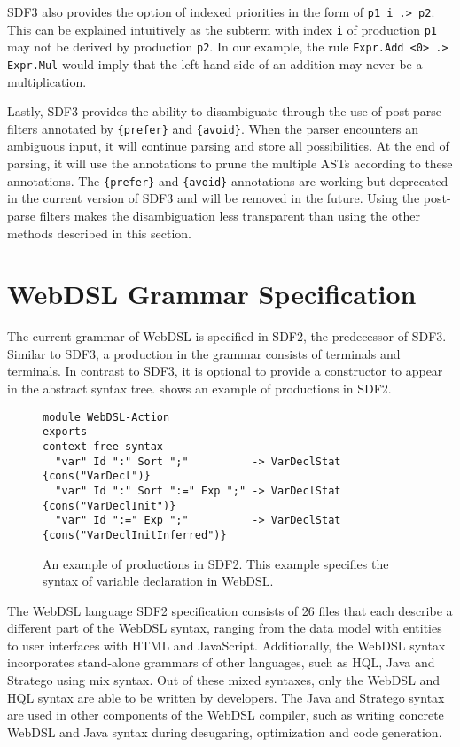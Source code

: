         SDF3 also provides the option of indexed priorities in the form of \texttt{p1 i .> p2}. This can be explained intuitively as the subterm with index \texttt{i} of production \texttt{p1} may not be derived by production \texttt{p2}. In our example, the rule \texttt{Expr.Add <0> .> Expr.Mul} would imply that the left-hand side of an addition may never be a multiplication.

        Lastly, SDF3 provides the ability to disambiguate through the use of post-parse filters annotated by \texttt{\{prefer\}} and \texttt{\{avoid\}}. When the parser encounters an ambiguous input, it will continue parsing and store all possibilities. At the end of parsing, it will use the annotations to prune the multiple ASTs according to these annotations. The \texttt{\{prefer\}} and \texttt{\{avoid\}} annotations are working but deprecated in the current version of SDF3 and will be removed in the future. Using the post-parse filters makes the disambiguation less transparent than using the other methods described in this section.

  \section{\label{sec:webdsl-grammar}WebDSL Grammar Specification}

    The current grammar of WebDSL is specified in SDF2, the predecessor of SDF3. Similar to SDF3, a production in the grammar consists of terminals and terminals. In contrast to SDF3, it is optional to provide a constructor to appear in the abstract syntax tree.  shows an example of productions in SDF2.

    \begin{figure}
      \begin{verbatim}
module WebDSL-Action
exports
context-free syntax
  "var" Id ":" Sort ";"          -> VarDeclStat {cons("VarDecl")}
  "var" Id ":" Sort ":=" Exp ";" -> VarDeclStat {cons("VarDeclInit")}
  "var" Id ":=" Exp ";"          -> VarDeclStat {cons("VarDeclInitInferred")}
      \end{verbatim}
      \caption{\label{fig:sdf2-example}An example of productions in SDF2. This example specifies the syntax of variable declaration in WebDSL.}
    \end{figure}

    The WebDSL language SDF2 specification consists of 26 files that each describe a different part of the WebDSL syntax, ranging from the data model with entities to user interfaces with HTML and JavaScript. Additionally, the WebDSL syntax incorporates stand-alone grammars of other languages, such as HQL, Java and Stratego using mix syntax. Out of these mixed syntaxes, only the WebDSL and HQL syntax are able to be written by developers. The Java and Stratego syntax are used in other components of the WebDSL compiler, such as writing concrete WebDSL and Java syntax during desugaring, optimization and code generation.

